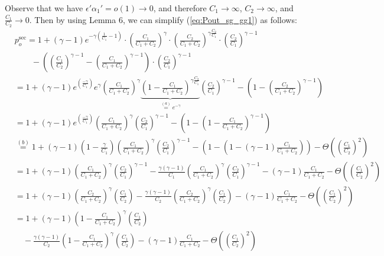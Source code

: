 \documentclass[journal,draftclsnofoot,onecolumn,12pt,twoside]{IEEEtran}
\begin{document}
Observe that we have $\epsilon'\alpha_1'=o(1)\to 0$, and therefore $C_1\to\infty$, $C_2\to\infty$, and $\frac{C_1}{C_2}\to 0$. Then by using Lemma 6, we can simplify (\ref{eq:Pout_sg_gg1}) as follows:
\begin{equation}
\begin{aligned}\label{eq:Pout_sg_gg1_2}
&p_o^{\text{sec}}= 1+(\gamma-1)e^{-\gamma\left(\frac{1}{C_1}-1\right)}\cdot\left(\frac{C_1}{C_1+C_2}\right)^{\gamma}\cdot\left(\frac{C_2}{C_1+C_2}\right)^{\gamma\frac{ C_2}{C_1}}\cdot\left(\frac{C_2}{C_1}\right)^{\gamma-1}\\
&\qquad-\left(\left(\frac{C_1}{C_2}\right)^{\gamma-1}-\left(\frac{C_1}{C_1+C_2}\right)^{\gamma-1}\right)\cdot\left(\frac{C_2}{C_1}\right)^{\gamma-1}\\
&=1+(\gamma-1)e^{\left(\frac{-\gamma}{C_1}\right)}e^{\gamma}\left(\frac{C_1}{C_1+C_2}\right)^{\gamma}\underbrace{\left(1-\frac{C_1}{C_1+C_2}\right)^{\gamma\frac{ C_2}{C_1}}}_{\stackrel{(a)}{=}e^{-\gamma}}\left(\frac{C_2}{C_1}\right)^{\gamma-1}-\left(1-\left(\frac{C_2}{C_1+C_2}\right)^{\gamma-1}\right)\\
&=1+(\gamma-1)e^{\left(\frac{-\gamma}{C_1}\right)}\left(\frac{C_1}{C_1+C_2}\right)^{\gamma}\left(\frac{C_2}{C_1}\right)^{\gamma-1}-\left(1-\left(1-\frac{C_1}{C_1+C_2}\right)^{\gamma-1}\right)\\
&\stackrel{(b)}{=}1+(\gamma-1)\left(1-\frac{\gamma}{C_1}\right)\left(\frac{C_1}{C_1+C_2}\right)^{\gamma}\left(\frac{C_2}{C_1}\right)^{\gamma-1}-\left(1-\left(1-(\gamma-1)\frac{C_1}{C_1+C_2}\right)\right)-\Theta\left(\left(\frac{C_1}{C_2}\right)^2\right)\\
&=1+(\gamma-1)\left(\frac{C_1}{C_1+C_2}\right)^{\gamma}\left(\frac{C_2}{C_1}\right)^{\gamma-1}-\frac{\gamma(\gamma-1)}{C_1}\left(\frac{C_1}{C_1+C_2}\right)^{\gamma}\left(\frac{C_2}{C_1}\right)^{\gamma-1}-(\gamma-1)\frac{C_1}{C_1+C_2}-\Theta\left(\left(\frac{C_1}{C_2}\right)^2\right)\\
&=1+(\gamma-1)\left(\frac{C_2}{C_1+C_2}\right)^{\gamma}\left(\frac{C_1}{C_2}\right)-\frac{\gamma(\gamma-1)}{C_2}\left(\frac{C_2}{C_1+C_2}\right)^{\gamma}\left(\frac{C_1}{C_2}\right)-(\gamma-1)\frac{C_1}{C_1+C_2}-\Theta\left(\left(\frac{C_1}{C_2}\right)^2\right)\\
&=1+(\gamma-1)\left(1-\frac{C_1}{C_1+C_2}\right)^{\gamma}\left(\frac{C_1}{C_2}\right)\\
&\quad-\frac{\gamma(\gamma-1)}{C_2}\left(1-\frac{C_1}{C_1+C_2}\right)^{\gamma}\left(\frac{C_1}{C_2}\right)-(\gamma-1)\frac{C_1}{C_1+C_2}-\Theta\left(\left(\frac{C_1}{C_2}\right)^2\right)\\

\end{aligned}
\end{equation}
\end{document}
